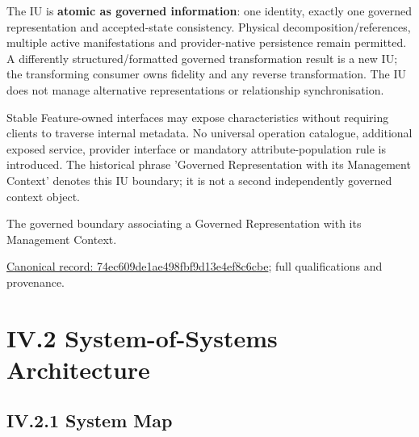 The IU is \textbf{atomic as governed information}: one identity, exactly one governed
representation and accepted-state consistency. Physical decomposition/references,
multiple active manifestations and provider-native persistence remain permitted.
A differently structured/formatted governed transformation result is a new IU;
the transforming consumer owns fidelity and any reverse transformation. The IU
does not manage alternative representations or relationship synchronisation.



Stable Feature-owned interfaces may expose characteristics without requiring clients
to traverse internal metadata. No universal operation catalogue, additional exposed
service, provider interface or mandatory attribute-population rule is introduced.
The historical phrase 'Governed Representation with its Management Context' denotes
this IU boundary; it is not a second independently governed context object.



The governed boundary associating a Governed Representation with its Management Context.


{\footnotesize \href{../../../../../../../../continuum/application/data-object/class/74ec609de1ae498fbf9d13e4ef8c6cbe.md}{Canonical record: 74ec609de1ae498fbf9d13e4ef8c6cbe}; full qualifications and provenance.}\par
\chapter*{IV.2 System-of-Systems Architecture}
\label{navigation:IV.2}

\section*{IV.2.1 System Map}
\label{navigation:IV.2.1}

